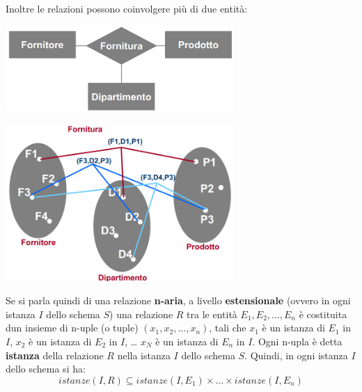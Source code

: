 \documentclass[12pt]{article}
\begin{document}
Inoltre le relazioni possono coinvolgere più di due entità:
\begin{center}
    \includegraphics[width = 0.65\textwidth]{Images/23.PNG}
\end{center}
\begin{center}
    \includegraphics[width = 0.65\textwidth]{Images/24.PNG}
\end{center}
Se si parla quindi di una relazione \textbf{n-aria}, a livello \textbf{estensionale} (ovvero in ogni istanza $I$ dello schema $S$) una relazione $R$ tra le entità
$E_1, E_2, \dots, E_n$ è costituita dun insieme di n-uple (o tuple) $(x_1, x_2, \dots, x_n)$, tali che $x_1$ è un istanza di $E_1$ in $I$, $x_2$ è un istanza di $E_2$ in $I$, \dots
$x_N$ è un istanza di $E_n$ in $I$.
Ogni n-upla è detta \textbf{istanza} della relazione $R$ nella istanza $I$ dello schema $S$.
Quindi, in ogni istanza $I$ dello schema si ha:
$$istanze(I,R) \subseteq istanze(I, E_1) \times \dots \times istanze(I, E_n)$$
\end{document}
